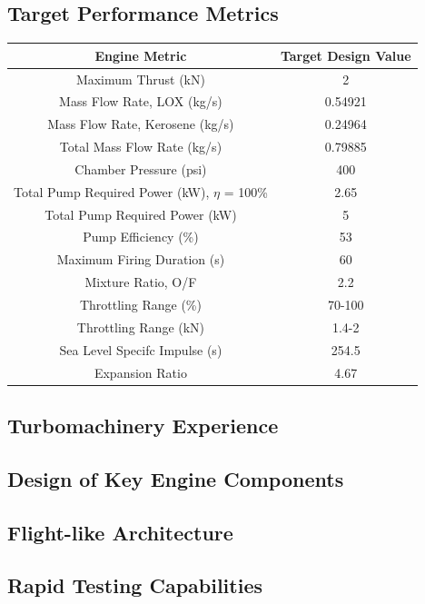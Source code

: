 \documentclass[12pt, letterpaper]{article}
\begin{document}
\newpage

\subsection{Target Performance Metrics}

\begin{tabular}{|c|c|}

\hline

Engine Metric & Target Design Value \\

\hline

Maximum Thrust (kN) & 2 \\
Mass Flow Rate, LOX (kg/s) & 0.54921 \\
Mass Flow Rate, Kerosene (kg/s) & 0.24964 \\
Total Mass Flow Rate (kg/s) & 0.79885 \\
Chamber Pressure (psi) & 400 \\
Total Pump Required Power  (kW), $\eta$ = 100\% & 2.65 \\
Total Pump Required Power (kW) & 5 \\
Pump Efficiency (\%) & 53 \\
Maximum Firing Duration (s) & 60 \\
Mixture Ratio, O/F & 2.2 \\
Throttling Range (\%) & 70-100 \\
Throttling Range (kN)& 1.4-2 \\
Sea Level Specifc Impulse (s) & 254.5 \\
Expansion Ratio & 4.67 \\

\hline

\end{tabular}

\subsection{Turbomachinery Experience}
\subsection{Design of Key Engine Components}
\subsection{Flight-like Architecture}
\subsection{Rapid Testing Capabilities}
\end{document}
